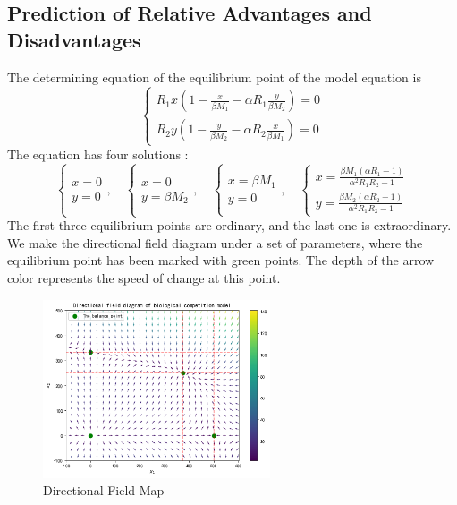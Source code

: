 \documentclass{mcmthesis}
\begin{document}
\subsection{Prediction of Relative Advantages and Disadvantages}
The determining equation of the equilibrium point of the model equation is
$$\left\{\begin{array}{l}
	R_{1} x\left(1-\frac{x}{\beta M_{1}}-\alpha R_{1} \frac{y}{\beta M_{2}}\right)=0 \\
	R_{2} y\left(1-\frac{y}{\beta M_{2}}-\alpha R_{2} \frac{x}{\beta M_{1}}\right)=0
\end{array}\right.$$
The equation has four solutions :
$$
\left\{\begin{array}{l}
	x=0 \\
	y=0
\end{array}, \quad\left\{\begin{array}{l}
	x=0 \\
	y=\beta M_{2}
\end{array}, \quad\left\{\begin{array}{l}
	x=\beta M_{1} \\
	y=0
\end{array}, \quad\left\{\begin{array}{l}
	x=\frac{\beta M_{1}\left(\alpha R_{1}-1\right)}{\alpha^2 R_1 R_2 - 1} \\
	y=\frac{\beta M_{2}\left(\alpha R_{2}-1\right)}{\alpha^2 R_1 R_2 - 1}
\end{array}\right.\right.\right.\right.$$
The first three equilibrium points are ordinary, and the last one is extraordinary. We make the directional field diagram under a set of parameters, where the equilibrium point has been marked with green points. The depth of the arrow color represents the speed of change at this point.
\begin{figure}[H]
	\centering
	\includegraphics[width=0.6\textwidth]{img/方向场图.png}
	\caption{Directional Field Map}\label{fig:方向场图}
\end{figure}
\end{document}
